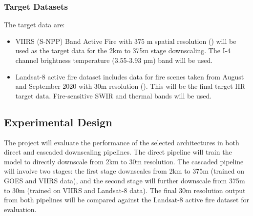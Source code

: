 \documentclass[a4paper, 11pt]{article}
\begin{document}
\subsubsection{Target Datasets}
The target data are:
\begin{itemize}
    \item  VIIRS (S-NPP) Band Active Fire with 375 m spatial resolution (\cite{earthsciencedatasystemsVIIRSSNPPBand2025}) will be used as the target data for the 2km to 375m stage downscaling. The I-4 channel brightness temperature (3.55-3.93 µm) band will be used.
    \item Landsat-8 active fire dataset includes data for fire scenes taken from August and September 2020 with 30m resolution (\cite{dealmeidapereiraActiveFireDetection2021}). This will be the final target HR target data. Fire-sensitive SWIR and thermal bands will be used.
\end{itemize}

\subsection{Experimental Design}
The project will evaluate the performance of the selected architectures in both direct and cascaded downscaling pipelines. The direct pipeline will train the model to directly downscale from 2km to 30m resolution. The cascaded pipeline will involve two stages: the first stage downscales from 2km to 375m (trained on GOES and VIIRS data), and the second stage will further downscale from 375m to 30m (trained on VIIRS and Landsat-8 data). The final 30m resolution output from both pipelines will be compared against the Landsat-8 active fire dataset for evaluation.
\end{document}
